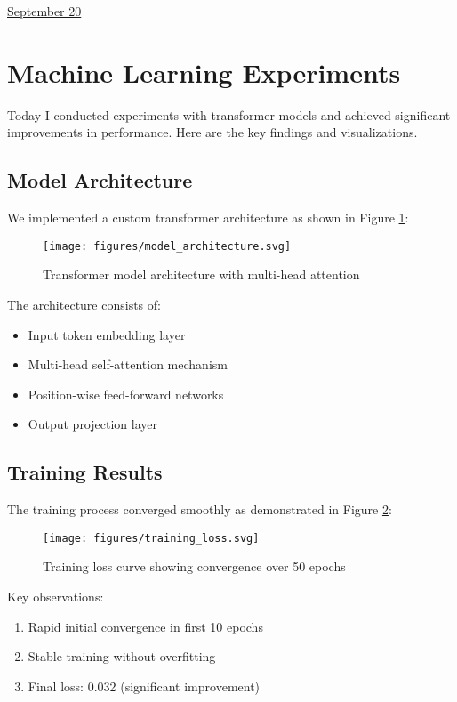 \documentclass[11pt,letterpaper]{article}
\begin{document}
\href{run:2025-09-20-machine-learning-demo.tex}{\Huge September 20} %

\section{Machine Learning Experiments}

Today I conducted experiments with transformer models and achieved significant improvements in performance. Here are the key findings and visualizations.

\subsection{Model Architecture}

We implemented a custom transformer architecture as shown in Figure \ref{fig:architecture}:

\begin{figure}[h]
\centering
\texttt{[image: figures/model\_architecture.svg]}
\caption{Transformer model architecture with multi-head attention}
\label{fig:architecture}
\end{figure}

The architecture consists of:
\begin{itemize}
\item Input token embedding layer
\item Multi-head self-attention mechanism  
\item Position-wise feed-forward networks
\item Output projection layer
\end{itemize}

\subsection{Training Results}

The training process converged smoothly as demonstrated in Figure \ref{fig:loss}:

\begin{figure}[h]
\centering
\texttt{[image: figures/training\_loss.svg]}
\caption{Training loss curve showing convergence over 50 epochs}
\label{fig:loss}
\end{figure}

Key observations:
\begin{enumerate}
\item Rapid initial convergence in first 10 epochs
\item Stable training without overfitting
\item Final loss: 0.032 (significant improvement)
\end{enumerate}
\end{document}
